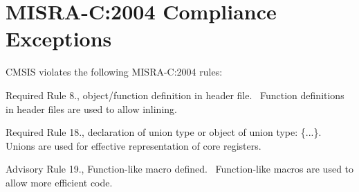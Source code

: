 \chapter{MISRA-\/C\+:2004 Compliance Exceptions}
\hypertarget{_c_m_s_i_s__m_i_s_r_a__exceptions}{}\label{_c_m_s_i_s__m_i_s_r_a__exceptions}
CMSIS violates the following MISRA-\/C\+:2004 rules\+:

\begin{DoxyItemize}
\item Required Rule 8., object/function definition in header file.~\newline
 Function definitions in header files are used to allow \textquotesingle{}inlining\textquotesingle{}.\end{DoxyItemize}
\begin{DoxyItemize}
\item Required Rule 18., declaration of union type or object of union type\+: \textquotesingle{}\{...\}\textquotesingle{}.~\newline
 Unions are used for effective representation of core registers.\end{DoxyItemize}
\begin{DoxyItemize}
\item Advisory Rule 19., Function-\/like macro defined.~\newline
 Function-\/like macros are used to allow more efficient code. \end{DoxyItemize}
